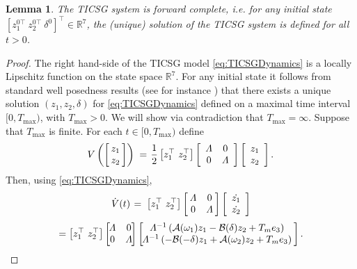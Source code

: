 \documentclass[letterpaper,10pt,conference]{ieeeconf}
\newtheorem{lemma}[theorem]{Lemma}
\newcommand{\rline}  {{\mathbb R}}
\renewcommand{\o}    {{\omega}}
\newcommand{\half}   {{\frac{1}{2}}}
\newcommand{\m}      {{\hbox{\hskip 1pt}}}
\newcommand{\nm}     {{\hbox{\hskip -3pt}}}
\newcommand{\Amscr}  {{\mathcal{A}}}
\newcommand{\Bmscr}  {{\mathcal{B}}}
\begin{document}
\begin{lemma}\label{lemma:forewordComplete}
The TICSG system is forward complete, i.e. for any initial state
$\left[ z_1^{0\top} \ z_2^{0\top} \ \delta^{0} \right]^\top \in
\mathbb{R}^7 $, the (unique) solution of the TICSG system is defined
for all $t>0$.
\end{lemma}

\begin{proof} The right hand-side of the TICSG model 
\eqref{eq:TICSGDynamics} is a locally Lipschitz function on the state
space $\rline^7$. For any initial state it follows from standard well
posedness results (see for instance \cite[Ch.~3]{Khalil}) that there
exists a unique solution $(z_1,z_2,\delta)$ for
\eqref{eq:TICSGDynamics} defined on a maximal time interval
$[0,{T_{\max}})$, with ${T_{\max}}>0$. We will show via contradiction 
that ${T_{\max}}=\infty$. Suppose that $T_{\max}$ is finite. For each 
$t\in[0,{T_{\max}})$ define
$$ V\left(\left[\nm\begin{array}{c} z_1\\ z_2\end{array}\nm\right]
   \right) \m=\m \half \left[z_1^\top\ z_2^\top\right]\left[
   \begin{array}{cc} \varLambda & 0\\ 0 & \varLambda \end{array}
   \right]\left[ \begin{array}{c} z_1\\ z_2 \end{array}\right].$$
Then, using \eqref{eq:TICSGDynamics},
$$ \dot{V}(t) \m=\m \left[ z_1^\top\ z_2^\top\right]\left[\nm
   \begin{array}{cc} \varLambda & 0\\ 0 & \varLambda \end{array}
   \nm\right]\left[\begin{array}{c} \dot{z_1}\\ \dot{z_2}
   \end{array}\right]$$ 
$$ = \left[z_1^\top\ z_2^\top\right]\left[\nm\nm
   \begin{array}{cc} \varLambda & 0\\ 0 & \varLambda \end{array}
   \nm\nm\right] \left[\nm\nm\begin{array}{c} \varLambda^{-1}
   \left( \Amscr(\o_1)z_1-\Bmscr(\delta)z_2+T_me_3\right)
   \\ \varLambda^{-1}\left(-\mathcal{B}(-\delta)z_1+\mathcal{A}
   (\o_2)z_2+T_m e_3\right) \end{array}\nm\right].$$

\end{proof}
\end{document}
